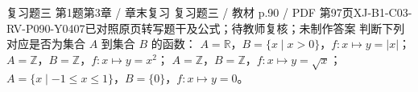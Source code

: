 \par\noindent\begin{minipage}{\linewidth}
\begin{bankitem}{复习题三 第1题}{第3章 / 章末复习 复习题三 / 教材 p.90 / PDF 第97页}{XJ-B1-C03-RV-P090-Y0407}{已对照原页转写题干及公式；待教师复核；未制作答案}
判断下列对应是否为集合 $A$ 到集合 $B$ 的函数：
$A=\mathbb R$，$B=\{x\mid x>0\}$，$f:x\mapsto y=|x|$；
$A=\mathbb Z$，$B=\mathbb Z$，$f:x\mapsto y=x^2$；
$A=\mathbb Z$，$B=\mathbb Z$，$f:x\mapsto y=\sqrt x$；
$A=\{x\mid-1\le x\le1\}$，$B=\{0\}$，$f:x\mapsto y=0$。
\end{bankitem}
\end{minipage}\par\medskip

